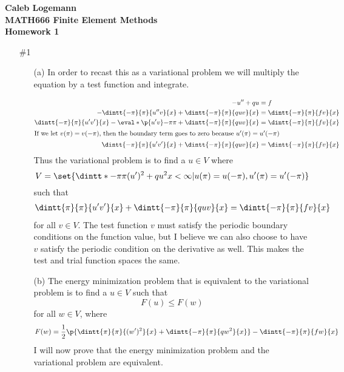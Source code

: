 \documentclass[11pt, oneside]{article}
\begin{document}
\noindent \textbf{\Large{Caleb Logemann \\
MATH666 Finite Element Methods \\
Homework 1
}}

%
\begin{enumerate}
  \item[\#1]
    \begin{enumerate}
    \item[(a)] %
      In order to recast this as a variational problem we will multiply the
      equation by a test function and integrate.

      \begin{align*}
        -u'' + q u &= f \\
        -\dintt{-\pi}{\pi}{u''v}{x} + \dintt{-\pi}{\pi}{quv}{x} &= \dintt{-\pi}{\pi}{fv}{x}\\
        \dintt{-\pi}{\pi}{u'v'}{x} - \eval*{\p{u'v}}{-\pi}{\pi}+ \dintt{-\pi}{\pi}{quv}{x} &= \dintt{-\pi}{\pi}{fv}{x} \\
        \intertext{If we let $v(\pi) = v(-\pi)$, then the boundary term goes to zero because $u'(\pi) = u'(-\pi)$}
        \dintt{-\pi}{\pi}{u'v'}{x} + \dintt{-\pi}{\pi}{quv}{x} &= \dintt{-\pi}{\pi}{fv}{x}
      \end{align*}
      Thus the variational problem is to find a $u \in V$ where
      \[
        V = \set{\dintt*{-\pi}{\pi}{(u')^2 + qu^2}{x} < \infty | u(\pi) = u(-\pi), u'(\pi) = u'(-\pi)}
      \]
      such that
      \begin{align*}
        \dintt{\pi}{\pi}{u'v'}{x} + \dintt{-\pi}{\pi}{quv}{x} &= \dintt{-\pi}{\pi}{fv}{x}
      \end{align*}
      for all $v \in V$.
      The test function $v$ must satisfy the periodic boundary conditions on the
      function value, but I believe we can also choose to have $v$ satisfy the
      periodic condition on the derivative as well.
      This makes the test and trial function spaces the same.

    \item[(b)] %
      The energy minimization problem that is equivalent to the variational
      problem is to find a $u \in V$ such that
      \[
        F(u) \le F(w)
      \]
      for all $w \in V$, where
      \[
        F(w) = \frac{1}{2}\p{\dintt{\pi}{\pi}{(w')^2}{x} + \dintt{-\pi}{\pi}{qw^2}{x}} - \dintt{-\pi}{\pi}{fw}{x}
      \]
      I will now prove that the energy minimization problem and the variational
      problem are equivalent.


\end{enumerate}
\end{enumerate}
\end{document}
